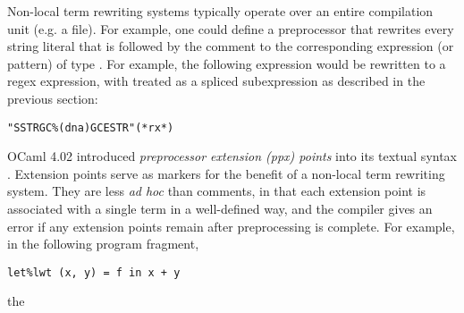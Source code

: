 {Non-local term rewriting systems typically operate over an entire compilation unit (e.g. a file). For example, one could define a preprocessor that rewrites every string literal that is followed by the comment  to the corresponding expression (or pattern) of type . For example, the following expression would be rewritten to a regex expression, with  treated as a spliced subexpression as described in the previous section:
\begin{lstlisting}[numbers=none]
"SSTRGC%(dna)GCESTR"(*rx*)
\end{lstlisting}

OCaml 4.02 introduced \emph{preprocessor extension (ppx) points} into its textual syntax \cite{ocaml-manual}. Extension points serve as markers for the benefit of a non-local term rewriting system. They are less \emph{ad hoc} than comments, in that each extension point is associated with a single term in a well-defined way, and the compiler gives an error if any extension points remain after preprocessing is complete. For example, in the following program fragment, 
\begin{lstlisting}[numbers=none]
let%lwt (x, y) = f in x + y
\end{lstlisting}
the \li{%
annotation on the let expression is recognized by a preprocessor distributed with \li{Lwt}, a lightweight threading library. This preprocessor rewrites this fragment to:
\begin{lstlisting}[numbers=none]
Lwt.bind f (fun (x, y) -> x + y)
\end{lstlisting}
The OCaml system is distributed with a library called \li{ppx_tools} that simplifies the task of writing  preprocessors that operate on terms annotated with extension points.

There are a number of other systems that support non-local term rewriting. For example, the \li{GHC} compiler for Haskell \cite{jones2001playing} and the \li{xoc} compiler for C \cite{conf/asplos/CoxBCKK08} both support user-defined non-local rewritings.

}}
